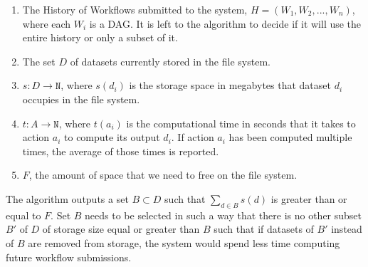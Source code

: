 \begin{enumerate}
\item The History of Workflows submitted to the system, $H = (W_1, W_2, ..., W_n)$, where each $W_i$ is a DAG. It is left to the algorithm to decide if it will use the entire history or only a subset of it.

\item The set $D$ of datasets currently stored in the file system. 

\item $s: D \to \mathtt{N} $, where $s(d_i)$ is the storage space in megabytes that dataset $d_i$ occupies in the file system.

\item $t: A \to \mathtt{N}$, where $t(a_i)$ is the computational time in seconds that it takes to action $a_i$ to compute its output $d_i$.  If action $a_i$ has been computed multiple times, the average of those times is reported.

\item $F$, the amount of space that we need to free on the file system.

\end{enumerate}

The algorithm outputs a set $B \subset D$ such that $\sum_{d \in B}{s(d)}$ is greater than or equal to $F$.  Set $B$ needs to be selected in such a way that there is no other subset $B'$ of $D$ of storage size equal or greater than $B$ such that if datasets of $B'$ instead of $B$ are removed from storage, the system would spend less time computing future workflow submissions. 